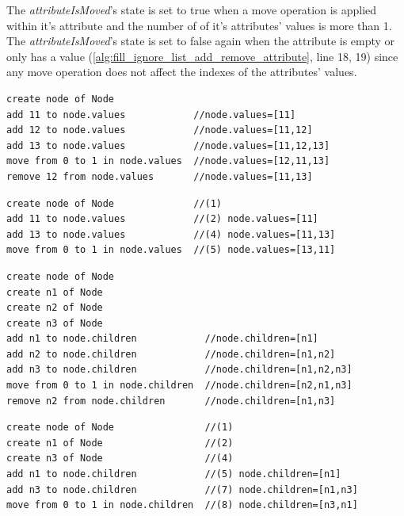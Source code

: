 \documentclass[sigconf]{acmart}
\begin{document}
The \emph{attributeIsMoved}'s state is set to true when a move operation is applied within it's attribute and the number of of it's attributes' values is more than 1. The \emph{attributeIsMoved}'s state is set to false again when the attribute is empty or only has a value (\ref{alg:fill_ignore_list_add_remove_attribute}, line 18, 19) since any move operation does not affect the indexes of the attributes' values.

\begin{lstlisting}[style=eol,caption={Example of CBP representation of attribute \emph{values}'s move operations.},label=lst:move_attribute_example]
create node of Node
add 11 to node.values            //node.values=[11] 
add 12 to node.values            //node.values=[11,12] 
add 13 to node.values            //node.values=[11,12,13] 
move from 0 to 1 in node.values  //node.values=[12,11,13]  
remove 12 from node.values       //node.values=[11,13] 
\end{lstlisting}

\begin{lstlisting}[style=eol,caption={Example of optimised CBP representation of attribute \emph{values}'s move operations.},label=lst:move_attribute_example_error]
create node of Node              //(1)  
add 11 to node.values            //(2) node.values=[11] 
add 13 to node.values            //(4) node.values=[11,13] 
move from 0 to 1 in node.values  //(5) node.values=[13,11]   
\end{lstlisting}




\begin{lstlisting}[style=eol,caption={Example of CBP representation of attribute \emph{values}'s move operations.},label=lst:move_attribute_object_example]
create node of Node
create n1 of Node
create n2 of Node
create n3 of Node
add n1 to node.children            //node.children=[n1] 
add n2 to node.children            //node.children=[n1,n2] 
add n3 to node.children            //node.children=[n1,n2,n3] 
move from 0 to 1 in node.children  //node.children=[n2,n1,n3]  
remove n2 from node.children       //node.children=[n1,n3] 
\end{lstlisting}

\begin{lstlisting}[style=eol,caption={Example of optimised CBP representation of attribute \emph{values}'s move operations.},label=lst:move_attribute_example_object_error]
create node of Node                //(1)  
create n1 of Node                  //(2)  
create n3 of Node                  //(4)  
add n1 to node.children            //(5) node.children=[n1] 
add n3 to node.children            //(7) node.children=[n1,n3] 
move from 0 to 1 in node.children  //(8) node.children=[n3,n1]   
\end{lstlisting}
\end{document}
